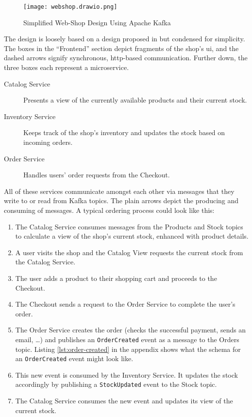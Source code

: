 \begin{figure}[H]
  \centering
  \texttt{[image: webshop.drawio.png]}
  \caption{Simplified Web-Shop Design Using Apache Kafka}\label{fig:web-shop}
\end{figure}

The design is loosely based on a design proposed in \cite[p.~148]{stopford_designing_2018} but condensed for simplicity.
The boxes in the \enquote{Frontend} section depict fragments of the shop's \gls{ui}, and the dashed arrows signify synchronous, \gls{http}-based communication.
Further down, the three boxes each represent a microservice.

\begin{description}
  \item[Catalog Service] Presents a view of the currently available products and their current stock.
  \item[Inventory Service] Keeps track of the shop's inventory and updates the stock based on incoming orders.
  \item[Order Service] Handles users' order requests from the Checkout.
\end{description}

All of these services communicate amongst each other via messages that they write to or read from Kafka topics.
The plain arrows depict the producing and consuming of messages.
A typical ordering process could look like this:

\begin{enumerate}
  \item The Catalog Service consumes messages from the Products and Stock topics to calculate a view of the shop's current stock, enhanced with product details.
  \item A user visits the shop and the Catalog View requests the current stock from the Catalog Service.
  \item The user adds a product to their shopping cart and proceeds to the Checkout.
  \item The Checkout sends a request to the Order Service to complete the user's order.
  \item The Order Service creates the order (checks the successful payment, sends an email, \ldots) and publishes an \texttt{OrderCreated} event as a message to the Orders topic.
  Listing \ref{lst:order-created} in the appendix shows what the schema for an \texttt{OrderCreated} event might look like.
  \item This new event is consumed by the Inventory Service. It updates the stock accordingly by publishing a \texttt{StockUpdated} event to the Stock topic.
  \item The Catalog Service consumes the new event and updates its view of the current stock.
\end{enumerate}

